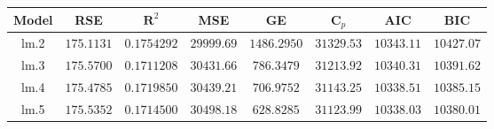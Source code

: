 \documentclass[12pt]{amsart}
\begin{document}
    \begin{center}
        \begin{tabular}{ c c c c c c c c}
            \hline
             \textbf{Model} & \textbf{RSE} & $\boldsymbol{R}^2$ & \textbf{MSE} & \textbf{GE} & $\boldsymbol{C}_p$ & \textbf{AIC} & \textbf{BIC}  \\ \hline
             lm.2 & $175.1131$ & $0.1754292$ & $29999.69$ & $1486.2950$ & $31329.53$ & $10343.11$ & $10427.07$ \\
             lm.3 & $175.5700$ & $0.1711208$ & $30431.66$ & $786.3479$ & $31213.92$ & $10340.31$ & $10391.62$ \\
             lm.4 & $175.4785$ & $0.1719850$ & $30439.21$ & $706.9752$ & $31143.25$ & $10338.51$ & $10385.15$ \\
             lm.5 & $175.5352$ & $0.1714500$ & $30498.18$ & $628.8285$ & $31123.99$ & $10338.03$ & $10380.01$ \\ \hline
        \end{tabular}
    \end{center}
    
\end{document}
